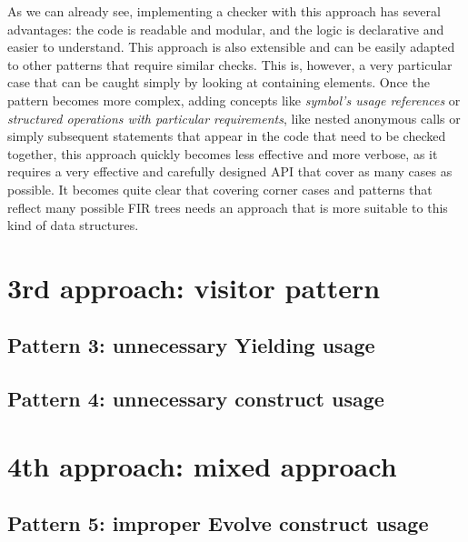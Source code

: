 \documentclass[12pt,a4paper,openright,twoside]{book}
\begin{document}




As we can already see, implementing a checker with this approach has several
advantages: the code is readable and modular, and the logic is
declarative and easier to understand. This approach is also extensible and
can be easily adapted to other patterns that require similar checks.
%
This is, however, a very particular case that can be caught simply by looking at
containing elements. Once the pattern becomes more complex, adding concepts like
\emph{symbol's usage references} or \emph{structured operations with particular
requirements}, like nested anonymous calls or simply subsequent statements that
appear in the code that need to be checked together, this approach quickly
becomes less effective and more verbose, as it requires a very effective and
carefully designed API that cover as many cases as possible. 
%
It becomes quite clear that covering corner cases and patterns that reflect many
possible \ac{FIR} trees needs an approach that is more suitable to this kind of
data structures.

\section{3rd approach: visitor pattern}

\subsection{Pattern 3: unnecessary Yielding usage}

\subsection{Pattern 4: unnecessary construct usage}

\section{4th approach: mixed approach}

\subsection{Pattern 5: improper Evolve construct usage}
\end{document}
